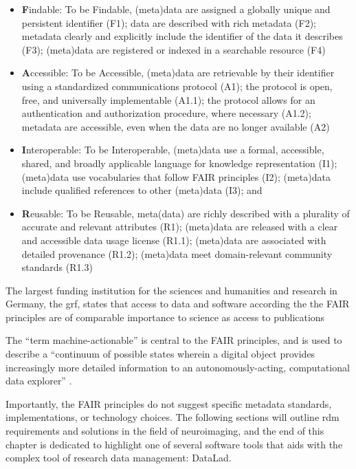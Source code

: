 \begin{itemize}
	\item \textbf{F}indable: To be Findable, (meta)data  are assigned a globally unique and persistent identifier (F1); data are described with rich metadata (F2); metadata clearly and explicitly include the identifier of the data it describes (F3);  (meta)data are registered or indexed in a searchable resource (F4)
	\item \textbf{A}ccessible: To be Accessible, (meta)data are retrievable by their identifier using a standardized communications protocol (A1); the protocol is open, free, and universally implementable (A1.1); the protocol allows for an authentication and authorization procedure, where necessary (A1.2);  metadata are accessible, even when the data are no longer available (A2)
	\item \textbf{I}nteroperable:  To be Interoperable, (meta)data use a formal, accessible, shared, and broadly applicable language for knowledge representation (I1); (meta)data use vocabularies that follow FAIR principles (I2); (meta)data include qualified references to other (meta)data (I3); and
	\item \textbf{R}eusable: To be Reusable, meta(data) are richly described with a plurality of accurate and relevant attributes (R1); (meta)data are released with a clear and accessible data usage license (R1.1); (meta)data are associated with detailed provenance (R1.2); (meta)data meet domain-relevant community standards (R1.3)
\end{itemize}

The largest funding institution for the sciences and humanities and research in Germany, the \gls{grf}, states that access to data and software according the the FAIR principles are of comparable importance to science as access to publications \citep{dfg}

The ``term machine-actionable'' is central to the \gls{FAIR} principles, and is used to describe a ``continuum of possible states wherein a digital object provides increasingly more detailed information to an autonomously-acting, computational data explorer'' \citep{wilkinson2016fair}.


Importantly, the \gls{FAIR} principles do not suggest specific metadata standards, implementations, or technology choices.
The following sections will outline \gls{rdm} requirements and solutions in the field of neuroimaging, and the end of this chapter is dedicated to  highlight one of several software tools that aids with the complex tool of research data management: DataLad.

